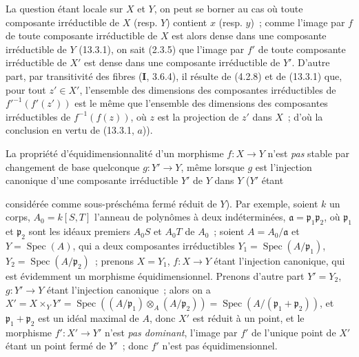La question étant locale sur $X$ et $Y$, on peut se borner au cas où toute
composante irréductible de $X$ (resp. $Y$) contient $x$ (resp. $y$)~; comme
l'image par $f$ de toute composante irréductible de $X$ est alors dense dans
une composante irréductible de $Y$ (13.3.1), on sait (2.3.5) que l'image par
$f'$ de toute composante irréductible de $X'$ est dense dans une composante
irréductible de $Y'$. D'autre part, par transitivité des fibres
(\textbf{I}, 3.6.4), il résulte de (4.2.8) et de (13.3.1) que, pour tout
$z'\in X'$, l'ensemble des dimensions des composantes irréductibles de
${f'}^{-1}(f'(z'))$ est le même que l'ensemble des dimensions des composantes
irréductibles de $f^{-1}(f(z))$, où $z$ est la projection de $z'$ dans $X$~;
d'où la conclusion en vertu de (13.3.1, $a$)).

\begin{remark}[13.3.9]
La propriété d'équidimensionnalité d'un morphisme $f:X\to Y$ n'est \emph{pas}
stable par changement de base quelconque $g:Y'\to Y$, même lorsque $g$ est
l'injection canonique d'une composante irréductible $Y'$ de $Y$ dans $Y$
($Y'$ étant

considérée comme sous-préschéma fermé réduit de $Y$). Par exemple, soient $k$
un corps, $A_0=k[S,T]$ l'anneau de polynômes à deux indéterminées,
$\mathfrak a=\mathfrak p_1\mathfrak p_2$, où $\mathfrak p_1$ et
$\mathfrak p_2$ sont les idéaux premiers $A_0S$ et $A_0T$ de $A_0$~; soient
$A=A_0/\mathfrak a$ et $Y=\operatorname{Spec}(A)$, qui a deux composantes
irréductibles $Y_1=\operatorname{Spec}(A/\mathfrak p_1)$,
$Y_2=\operatorname{Spec}(A/\mathfrak p_2)$~; prenons $X=Y_1$,
$f:X\to Y$ étant l'injection canonique, qui est évidemment un morphisme
équidimensionnel. Prenons d'autre part $Y'=Y_2$, $g:Y'\to Y$ étant l'injection
canonique~; alors on a
$X'=X\times_Y Y'=\operatorname{Spec}((A/\mathfrak p_1)\otimes_A
(A/\mathfrak p_2))=\operatorname{Spec}(A/(\mathfrak p_1+\mathfrak p_2))$,
et $\mathfrak p_1+\mathfrak p_2$ est un idéal maximal de $A$, donc $X'$ est
réduit à un point, et le morphisme $f':X'\to Y'$ n'est \emph{pas dominant},
l'image par $f'$ de l'unique point de $X'$ étant un point fermé de $Y'$~;
donc $f'$ n'est pas équidimensionnel.


\end{remark}
